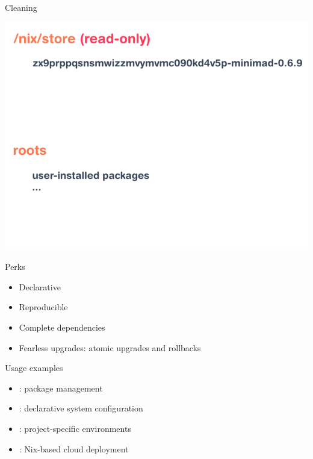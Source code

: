 \documentclass[aspectratio=169]{beamer}
\newcommand{\couleur}[2]{{\color{#1}{#2}}}
\begin{document}
\begin{frame}{Cleaning}
{\begin{center}
            \includegraphics[height=0.98\textheight]{img/schema-nix-store-gc-4.pdf}
        \end{center}
    }
\end{frame}

\begin{frame}{Perks}
    \begin{exampleblock}{}
        \begin{itemize}
            \item Declarative
            \item Reproducible
            \item Complete dependencies
            \item Fearless upgrades: atomic upgrades and rollbacks
        \end{itemize}
    \end{exampleblock}
\end{frame}

\begin{frame}{Usage examples}
    \begin{itemize}
        \item \couleur{blue-portage}{Nix}: package management
        \item \couleur{blue-portage}{NixOS}: declarative system configuration
        \item \couleur{blue-portage}{Nix shell}: project-specific environments
        \item \couleur{blue-portage}{NixOps}: Nix-based cloud deployment
    \end{itemize}
\end{frame}
\end{document}
